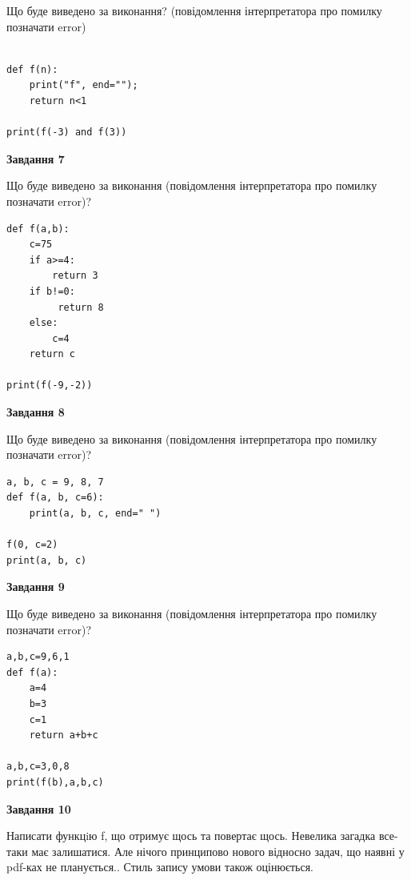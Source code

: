 \documentclass[12pt, ukrainian]{article}
\begin{document}
{\begin {large}
Що буде виведено за виконання? (повідомлення інтерпретатора про помилку позначати error)\par
\begin{verbatim}

def f(n):
    print("f", end="");
    return n<1

print(f(-3) and f(3))
\end{verbatim}

{\begin {center}\textbf{Завдання 7}\end {center}}

Що буде виведено за виконання (повідомлення інтерпретатора про помилку позначати error)?\par
\begin{verbatim}
def f(a,b):
    c=75
    if a>=4:
        return 3
    if b!=0:
         return 8
    else: 
        c=4
    return c

print(f(-9,-2))
\end{verbatim}

{\begin {center}\textbf{Завдання 8}\end {center}}

Що буде виведено за виконання (повідомлення інтерпретатора про помилку позначати error)?\par
\begin{verbatim}
a, b, c = 9, 8, 7
def f(a, b, c=6):
    print(a, b, c, end=" ")

f(0, c=2)
print(a, b, c)
\end{verbatim}

{\begin {center}\textbf{Завдання 9}\end {center}}

Що буде виведено за виконання (повідомлення інтерпретатора про помилку позначати error)?\par
\begin{verbatim}
a,b,c=9,6,1
def f(a):
    a=4
    b=3
    c=1
    return a+b+c

a,b,c=3,0,8
print(f(b),a,b,c)
\end{verbatim}

{\begin {center}\textbf{Завдання 10}\end {center}}


Написати функцiю f, що отримує щось та повертає щось. Невелика загадка все-таки має залишатися. Але нічого принципово нового відносно задач, що наявні у pdf-ках не планується.. Стиль запису умови також оцінюється.\par
\end {large}}
\newpage
\end{document}
